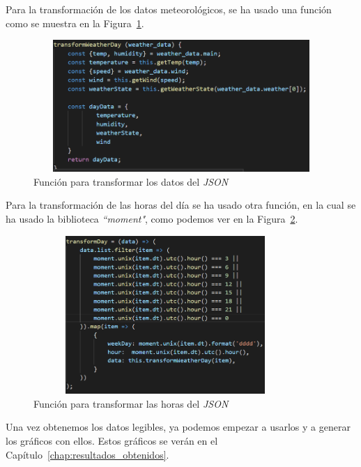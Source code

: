 \documentclass[a4paper, 12pt]{book}
\begin{document}
Para la transformación de los datos meteorológicos, se ha usado una función como se muestra en la Figura~\ref{fig:transform_day}.
\begin{figure}[h]
  \centering
  \includegraphics[width=12cm, height=5cm]{img_usadas/transform_day.png}
  \caption{Función para transformar los datos del \textit{JSON}}
  \label{fig:transform_day}
\end{figure}

\vspace{5mm}
Para la transformación de las horas del día se ha usado otra función, en la cual se ha usado la biblioteca \textit{``moment"}, como podemos ver en la Figura~\ref{fig:transform_data}.
\begin{figure}[h]
  \centering
  \includegraphics[width=10cm, height=6cm]{img_usadas/transform_data.png}
  \caption{Función para transformar las horas del \textit{JSON}}
  \label{fig:transform_data}
\end{figure}

Una vez obtenemos los datos legibles, ya podemos empezar a usarlos y a generar los gráficos con ellos. Estos gráficos se verán en el Capítulo~\ref{chap:resultados_obtenidos}.
\end{document}
